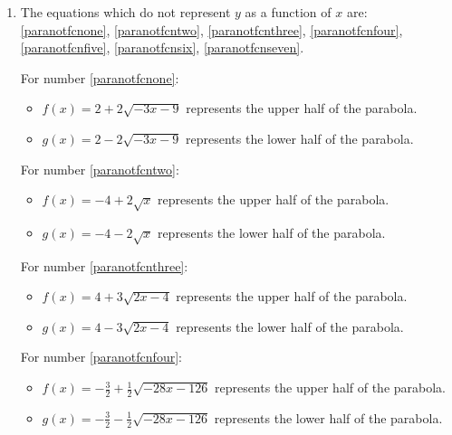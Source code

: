 \documentclass{ximera}
\begin{document}
\begin{enumerate}
\setcounter{enumi}{\value{HW}}

\item  The equations which do not represent $y$ as a function of $x$ are:  \ref{paranotfcnone}, \ref{paranotfcntwo}, \ref{paranotfcnthree}, \ref{paranotfcnfour}, \ref{paranotfcnfive}, \ref{paranotfcnsix}, \ref{paranotfcnseven}.


For number \ref{paranotfcnone}:

\begin{itemize}

\item  $f(x) = 2+2 \sqrt{-3x-9}$ represents the upper half of the parabola.

\item  $g(x) =  2 - 2\sqrt{-3x-9}$ represents the lower half of the parabola.

\end{itemize}

For number \ref{paranotfcntwo}:

\begin{itemize}

\item  $f(x) = -4+2\sqrt{x}$ represents the upper half of the parabola.

\item  $g(x) =  -4 - 2\sqrt{x}$  represents the lower half of the parabola.

\end{itemize}


For number \ref{paranotfcnthree}:

\begin{itemize}

\item   $f(x) =4+3 \sqrt{2x-4}$ represents the upper half of the parabola.

\item  $g(x) =  4-3 \sqrt{2x-4}$  represents the lower half of the parabola.

\end{itemize}


For number \ref{paranotfcnfour}:

\begin{itemize}

\item   $f(x) =-\frac{3}{2} + \frac{1}{2} \sqrt{-28x - 126}$ represents the upper half of the parabola.

\item  $g(x) =-\frac{3}{2} -  \frac{1}{2} \sqrt{-28x - 126}$  represents the lower half of the parabola.


\end{itemize}
\end{enumerate}
\end{document}
